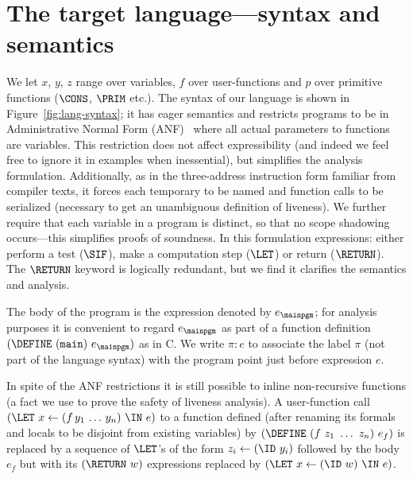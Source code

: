 \section{The target language---syntax and semantics}
\label{sec:defs}
We let $x$, $y$, $z$ range over variables, $f$ over user-functions and $p$ over primitive
functions ($\CONS$, $\PRIM$ etc.).
The syntax  of our language is  shown in Figure~\ref{fig:lang-syntax};
it has eager semantics and restricts programs to be in 
Administrative  Normal Form (ANF)~\cite{chakravarty03perspective}
where all actual parameters to functions are variables.
This restriction does not affect expressibility (and indeed we feel free
to ignore it in examples when inessential), but simplifies the analysis formulation.
Additionally, as in the three-address instruction form familiar from compiler texts,
it forces each temporary to be named and function calls to be serialized
(necessary to get an unambiguous definition of liveness).
We further require that each variable in a program is distinct, so that no scope shadowing
occurs---this simplifies proofs of soundness.
In this formulation expressions: either perform a test ($\SIF$), make a computation step ($\LET$)
or return ($\RETURN$).
The $\RETURN$ keyword is logically redundant, but we find it clarifies the semantics and analysis.


The body of the program is
the  expression denoted  by  $e_\mainpgm$; for analysis purposes
it is convenient
to regard $e_\mainpgm$ as part of a function definition
$(\DEFINE\ ({\tt main})\ e_\mainpgm)$ as in C\@.
We write $\pi\!:\!e$ to associate the  label $\pi$ (not part of the language syntax) with the program point just  before expression $e$.

In spite of the ANF restrictions it is still possible
to inline non-recursive functions (a fact we use to prove the safety
of liveness analysis).  A user-function call
$(\LET\,\, x \leftarrow (f\,y_1\,\ldots\,y_n) \,\, \IN\,\, e)$
to a function defined
(after renaming its formals and locals to be disjoint from existing variables)
by $(\DEFINE\ (f\ z_1\ \ldots\ z_n)\ e_f)$
is replaced by a sequence of $\LET$'s of the form
$z_i\leftarrow (\ID\,\,y_i)$ followed by
the body $e_f$ but with its $(\RETURN\,\,w)$ expressions replaced by
$(\LET\,\, x \leftarrow (\ID\,\, w) \,\, \IN\,\, e)$.

